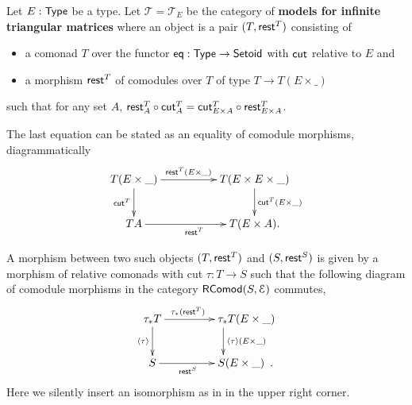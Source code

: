 \documentclass[a4paper,USenglish]{lipics}
\newcommand{\fat}[1]{\textbf{#1}}
\begin{document}
\begin{defn}
\label{def:cat_tri}
   Let $E:\mathsf{Type}$ be a type.
   Let $\mathcal{T} = \mathcal{T}_E$ be the category of \fat{models for infinite triangular matrices} where an object is a pair $(T,\mathsf{rest}^T)$ consisting of
   \begin{itemize}
    \item a comonad $T$ over the functor $\mathsf{eq}:\mathsf{Type}\to\mathsf{Setoid}$ with $\mathsf{cut}$ relative to $E$ and
    \item a morphism $\mathsf{rest}^T$ of comodules over $T$ of type $T \to T(E\times \_)$
   \end{itemize}
   such that for any set $A$,
    $ {\mathsf{rest}^T_A} \circ {\ensuremath{\mathsf{cut}}^T_A} = {\mathsf{cut}^T_{E\times A}} \circ {\ensuremath{\mathsf{rest}}^T_{E\times A}}$.
    
 \begin{Long}
   The last equation can be stated as an equality of comodule morphisms, diagrammatically
   \[
    \begin{xy}
     \xymatrix@C=5em{
                     T(E\times \_) \ar[d]_{\cut^T} \ar[r]^-{\tail^T(E\times \_ )} & T(E \times E \times \_)  \ar[d]^{\cut^T(E\times\_)} \\
                     T A \ar[r]_{\tail^T} & T (E\times A).
     }
    \end{xy}
   \]

\end{Long}
  
   
   A morphism between two such objects $(T,\mathsf{rest}^T)$ and $(S,\mathsf{rest}^S)$
   is given by a morphism of relative comonads with cut $\tau : T \to S$ such that
   the following diagram of comodule morphisms in the category $\mathsf{RComod}(S,\mathcal{E})$ commutes,
   \begin{equation} \begin{xy}
       \xymatrix{   \tau_*T  \ar[r]^{\tau_*(\tail^T)} \ar[d]_{\induced{\tau}}  &  **[r] \tau_*T (E\times \_ )\ar[d]^{\induced{\tau}(E\times \_)} \\
                    S  \ar[r]_{\tail^S}  &  **[r] S (E\times \_ ) \enspace .
        }
      \end{xy}
      \label{eq:tri_model}
   \end{equation}
   Here we silently insert an isomorphism as in  in the upper right corner.
\end{defn}   
\end{document}
